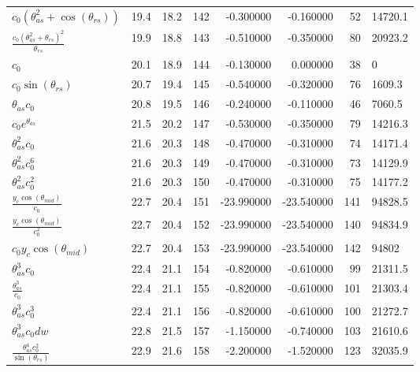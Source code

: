 \begin{tabularx}{\textwidth}{lllrrrrl}
$ c_{0} \left(\theta_{as}^{2} + \cos{\left(\theta_{rs} \right)}\right) $  &  19.4  &  18.2  &  142  &  -0.300000  &  -0.160000  &  52  &  14720.1  \\ 
$ \displaystyle\frac{c_{0} \left(\theta_{as}^{2} + \theta_{rs}\right)^{2}}{\theta_{rs}} $  &  19.9  &  18.8  &  143  &  -0.510000  &  -0.350000  &  80  &  20923.2  \\ 
$ c_{0} $  &  20.1  &  18.9  &  144  &  -0.130000  &  0.000000  &  38  &  0\phantom{.0}  \\ 
$ c_{0} \sin{\left(\theta_{rs} \right)} $  &  20.7  &  19.4  &  145  &  -0.540000  &  -0.320000  &  76  &  1609.3  \\ 
$ \theta_{as} c_{0} $  &  20.8  &  19.5  &  146  &  -0.240000  &  -0.110000  &  46  &  7060.5  \\ 
$ c_{0} e^{\theta_{as}} $  &  21.5  &  20.2  &  147  &  -0.530000  &  -0.350000  &  79  &  14216.3  \\ 
$ \theta_{as}^{2} c_{0} $  &  21.6  &  20.3  &  148  &  -0.470000  &  -0.310000  &  74  &  14171.4  \\ 
$ \theta_{as}^{2} c_{0}^{6} $  &  21.6  &  20.3  &  149  &  -0.470000  &  -0.310000  &  73  &  14129.9  \\ 
$ \theta_{as}^{2} c_{0}^{2} $  &  21.6  &  20.3  &  150  &  -0.470000  &  -0.310000  &  75  &  14177.2  \\ 
$ \displaystyle\frac{y_c \cos{\left(\theta_{mid} \right)}}{c_{0}} $  &  22.7  &  20.4  &  151  &  -23.990000  &  -23.540000  &  141  &  94828.5  \\ 
$ \displaystyle\frac{y_c \cos{\left(\theta_{mid} \right)}}{c_{0}^{2}} $  &  22.7  &  20.4  &  152  &  -23.990000  &  -23.540000  &  140  &  94834.9  \\ 
$ c_{0} y_c \cos{\left(\theta_{mid} \right)} $  &  22.7  &  20.4  &  153  &  -23.990000  &  -23.540000  &  142  &  94802\phantom{.0}  \\ 
$ \theta_{as}^{3} c_{0} $  &  22.4  &  21.1  &  154  &  -0.820000  &  -0.610000  &  99  &  21311.5  \\ 
$ \displaystyle\frac{\theta_{as}^{3}}{c_{0}} $  &  22.4  &  21.1  &  155  &  -0.820000  &  -0.610000  &  101  &  21303.4  \\ 
$ \theta_{as}^{3} c_{0}^{3} $  &  22.4  &  21.1  &  156  &  -0.820000  &  -0.610000  &  100  &  21272.7  \\ 
$ \theta_{as}^{3} c_{0} d w $  &  22.8  &  21.5  &  157  &  -1.150000  &  -0.740000  &  103  &  21610.6  \\ 
$ \displaystyle\frac{\theta_{as}^{4} c_{0}^{2}}{\sin{\left(\theta_{rs} \right)}} $  &  22.9  &  21.6  &  158  &  -2.200000  &  -1.520000  &  123  &  32035.9  \\ 

\end{tabularx}
